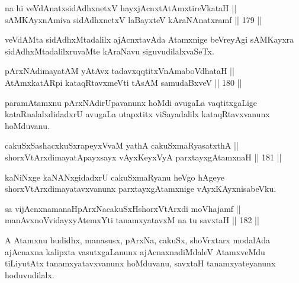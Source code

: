 \begin{shl}
na hi veVdAnatxsidAdhxnetxV hayxjAcnxtAtAmxtireVkataH || \\
sAMKAyxnAmiva sidAdhxnetxV laBayxteV kAraNAnatxramf \hfill || 179 ||  
\end{shl}

\begin{artha}
veVdAMta sidAdhxMtadalilx ajAcnxtavAda Atamxnige beVreyAgi sAMKayxra
sidAdhxMtadalilxruvaMte kAraNavu siguvudilalxvaSeTx.
\end{artha}


\begin{shl}
pArxNAdimayatAM yAtAvx tadavxqqtitxVnAmaboVdhataH || \\
AtAmx\s katAR\s pi kataqRtavxmeVti tAsAM samudaBxveV \hfill || 180 ||  
\end{shl}

\begin{artha}
paramAtamxnu pArxNAdirUpavanunx hoMdi avugaLa vaqtitxgaLige
kataRnalalxdidadxrU avugaLa utapxtitx viSayadalilx kataqRtavxvanunx
hoMduvanu.
\end{artha}


\begin{shl}
cakuSxSashacxkuSxrapeyxVvaM yathA cakuSxmaRyasatxthA || \\
shorxVtArxdimayatA\s payxsayx vAyxKeyxVyA parxtayxgAtamxnaH \hfill || 181 ||  
\end{shl}

\begin{artha}
kaNiNxge kaNANxgidadxrU cakuSxmaRyanu heVgo hAgeye
shorxVtArxdimayatavxvanunx parxtayxgAtamxnige vAyxKAyxnisabeVku.
\end{artha}

\begin{shl}
sa vijAcnxnamanaHpArxNacakuSxHshorxVtArxdi moVhajamf || \\
manAvxnoV\s vidayxyA\s \s temxYti tanamxyatavxM na tu savxtaH \hfill || 182 ||  
\end{shl}

\begin{artha}
A Atamxnu budidhx, manasusx, pArxNa, cakuSx, shoVrxtarx modalAda ajAcnaxna kalipxta vasutxgaLanunx ajAcnaxnadiMdaleV AtamxveMdu tiLiyutAtx tanamxyatavxvanunx hoMduvanu, savxtaH tanamxyateyanunx hoduvudilalx.
\end{artha}


